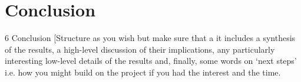 \clearpage
\section{Conclusion}

6 Conclusion
[Structure as you wish but make sure that a it includes a synthesis of the results, a high-level
discussion of their implications, any particularly interesting low-level details of the results and,
finally, some words on ‘next steps’ i.e. how you might build on the project if you had the interest and
the time.
